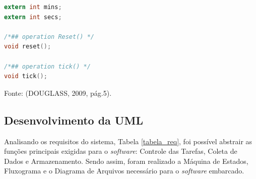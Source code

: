 \begin{lstlisting}[caption={Transcrição do Timer UML para código em C.},label={lst:codigo3},language=C]
extern int mins; 
extern int secs;

/*## operation Reset() */
void reset();

/*## operation tick() */
void tick();

\end{lstlisting}
\begin{center}
	Fonte: (DOUGLASS, 2009, pág.5).
\end{center}

\subsection{Desenvolvimento da UML}

Analisando os requisitos do sistema, Tabela \ref{tabela_req}, foi possível abstrair as funções principais exigidas para o \textit{software}: Controle das Tarefas, Coleta de Dados e Armazenamento. Sendo assim, foram realizado a Máquina de Estados, Fluxograma e o Diagrama de Arquivos necessário para o \textit{software} embarcado. 

